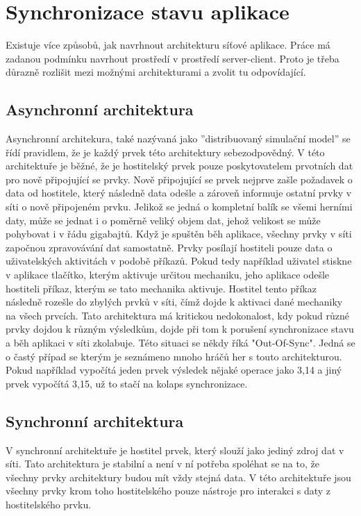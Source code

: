 \documentclass[FM,BP]{tulthesis}
\begin{document}
\section{Synchronizace stavu aplikace}
Existuje  více způsobů, jak navrhnout architekturu síťové aplikace. Práce má zadanou podmínku navrhout prostředí v prostředí server-client. Proto je třeba důrazně rozlišit mezi možnými architekturami a zvolit tu odpovídající.

\subsection{Asynchronní architektura}
Asynchronní architekura, také nazývaná jako ''distribuovaný simulační model'' se řídí pravidlem, že je každý prvek této architektury sebezodpovědný. V této architektuře je běžné, že je hostitelský prvek pouze poskytovatelem prvotních dat pro nově připojující se prvky\cite{paradox_challenge_2025}.
Nově připojující se prvek nejprve zašle požadavek o data od hostitele, který následně data odešle a zároveň informuje ostatní prvky v síti o nově připojeném prvku. Jelikož se jedná o kompletní balík se všemi herními daty, může se jednat i o poměrně veliký objem dat, jehož velikost se může pohybovat i v řádu gigabajtů.
Když je spuštěn běh aplikace, všechny prvky v síti započnou zpravovávání dat samostatně. Prvky posílají hostiteli pouze data o uživatelských aktivitách v podobě příkazů. Pokud tedy například uživatel stiskne v aplikace tlačítko, kterým aktivuje určitou mechaniku, jeho aplikace odešle hostiteli příkaz, kterým se tato mechanika aktivuje. Hostitel tento příkaz následně rozešle do zbylých prvků v síti, čímž dojde k aktivaci dané mechaniky na všech prvcích.
Tato architektura má kritickou nedokonalost, kdy pokud různé prvky dojdou k různým výsledkům, dojde při tom k porušení synchronizace stavu a běh aplikaci v síti zkolabuje. Této situaci se někdy říká "Out-Of-Sync". Jedná se o častý případ se kterým je seznámeno mnoho hráčů her s touto architekturou. Pokud například vypočítá jeden prvek výsledek nějaké operace jako 3,14 a jiný prvek vypočítá 3,15, už to stačí na kolaps synchronizace.

\subsection{Synchronní architektura}
V synchronní architektuře je hostitel prvek, který slouží jako jediný zdroj dat v síti. Tato architektura je stabilní a není v ní potřeba spoléhat se na to, že všechny prvky architektury budou mít vždy stejná data. V této architektuře jsou všechny prvky krom toho hostitelského pouze nástroje pro interakci s daty z hostitelského prvku.
\end{document}
